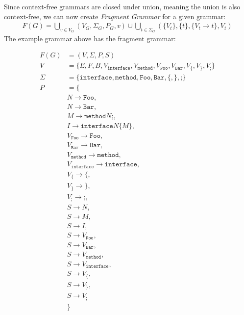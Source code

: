 \documentclass[runningheads,a4paper]{llncs}
\begin{document}
Since context-free grammars are closed under union, meaning the union is also context-free, we can now create \textit{Fragment Grammar} for a given grammar:
\begin{align*}
F(G) = 
\bigcup\limits_{v \in V_G} (V_G,\Sigma_G,P_G,v)
\cup
\bigcup\limits_{t \in \Sigma_G} (\{V_t\},\{t\},\{V_t \rightarrow t\}, V_t)
\end{align*}
The example grammar above has the fragment grammar:
\begin{center}
\small
\begin{align*}
F(G) &= (V,\Sigma,P,S)
\\V &= \{ E,F,B,V_\texttt{interface},V_\texttt{method},V_\texttt{Foo},V_\texttt{Bar},V_\texttt{\{},V_\texttt{\}}, V_\texttt{;} \}
\\\Sigma &= \{ \texttt{interface}, \texttt{method}, \texttt{Foo}, \texttt{Bar}, \texttt{\{}, \texttt{\}}, \texttt{;} \}
\\P &= \{ 
\\& N \rightarrow \texttt{Foo},
\\& N \rightarrow \texttt{Bar},
\\& M \rightarrow \texttt{method} N \texttt{;},
\\& I \rightarrow \texttt{interface} N \texttt{\{} M \texttt{\}},
\\& V_\texttt{Foo} \rightarrow \texttt{Foo},
\\& V_\texttt{Bar} \rightarrow \texttt{Bar},
\\& V_\texttt{method} \rightarrow \texttt{method},
\\& V_\texttt{interface} \rightarrow \texttt{interface},
\\& V_\texttt{\{} \rightarrow \texttt{\{},
\\& V_\texttt{\}} \rightarrow \texttt{\}},
\\& V_\texttt{;} \rightarrow \texttt{;},
\\& S \rightarrow N,
\\& S \rightarrow M,
\\& S \rightarrow I,
\\& S \rightarrow V_\texttt{Foo},
\\& S \rightarrow V_\texttt{Bar},
\\& S \rightarrow V_\texttt{method},
\\& S \rightarrow V_\texttt{interface},
\\& S \rightarrow V_\texttt{\{},
\\& S \rightarrow V_\texttt{\}},
\\& S \rightarrow V_\texttt{;}
\\& \}
\end{align*}
\end{center}
\end{document}
